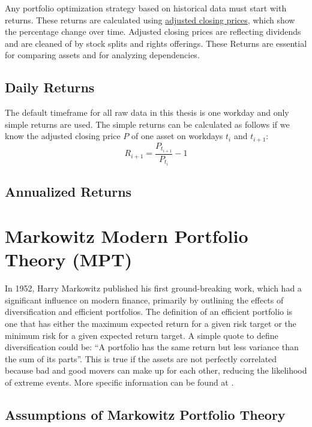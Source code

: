 \documentclass[
  oneside]{book}
\begin{document}
Any portfolio optimization strategy based on historical data must start with returns. These returns are calculated using \href{https://www.investopedia.com/terms/a/adjusted\%20closing\%20price.asp}{adjusted closing prices}, which show the percentage change over time. Adjusted closing prices are reflecting dividends and are cleaned of by stock splits and rights offerings. These Returns are essential for comparing assets and for analyzing dependencies.

\hypertarget{daily-returns}{%
\subsection{Daily Returns}\label{daily-returns}}

The default timeframe for all raw data in this thesis is one workday and only simple returns are used. The simple returns can be calculated as follows if we know the adjusted closing price \(P\) of one asset on workdays \(t_i\) and \(t_{i+1}\):
\[
  R_{i+1} = \frac{P_{t_{i+1}}}{P_{t_i}}-1
\]

\hypertarget{annualized-returns}{%
\subsection{Annualized Returns}\label{annualized-returns}}

\hypertarget{markowitz-modern-portfolio-theory-mpt}{%
\section{Markowitz Modern Portfolio Theory (MPT)}\label{markowitz-modern-portfolio-theory-mpt}}

In 1952, Harry Markowitz published his first ground-breaking work, which had a significant influence on modern finance, primarily by outlining the effects of diversification and efficient portfolios. The definition of an efficient portfolio is one that has either the maximum expected return for a given risk target or the minimum risk for a given expected return target. A simple quote to define diversification could be: ``A portfolio has the same return but less variance than the sum of its parts''. This is true if the assets are not perfectly correlated because bad and good movers can make up for each other, reducing the likelihood of extreme events. More specific information can be found at \citep{Mari2005}.

\hypertarget{assumptions-of-markowitz-portfolio-theory}{%
\subsection{Assumptions of Markowitz Portfolio Theory}\label{assumptions-of-markowitz-portfolio-theory}}
\end{document}

